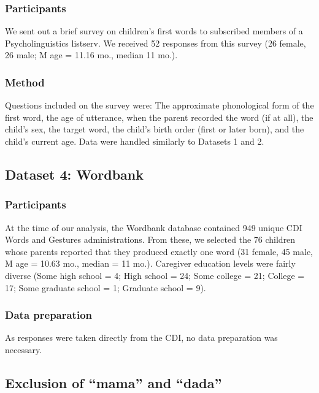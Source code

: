 \documentclass[10pt,letterpaper]{article}
\begin{document}
\subsubsection{Participants}

We sent out a brief survey on children's first words to subscribed members of a Psycholinguistics listserv. We received 52 responses from this survey (26 female, 26 male; M age = 11.16 mo., median 11 mo.).

\subsubsection{Method}

Questions included on the survey were: The approximate phonological form of the first word, the age of utterance, when the parent recorded the word (if at all), the child's sex, the target word, the child's birth order (first or later born), and the child's current age. Data were handled similarly to Datasets 1 and 2. 

\subsection{Dataset 4: Wordbank}

\subsubsection{Participants}

At the time of our analysis, the Wordbank database contained 949 unique CDI Words and Gestures administrations. From these, we selected the 76 children whose parents reported that they produced exactly one word (31 female, 45 male, M age = 10.63 mo., median = 11 mo.). Caregiver education levels were fairly diverse (Some high school = 4; High school = 24; Some college = 21; College = 17; Some graduate school = 1; Graduate school = 9). 

\subsubsection{Data preparation}

As responses were taken directly from the CDI, no data preparation was necessary.


\subsection{Exclusion of ``mama'' and ``dada''}
\end{document}
